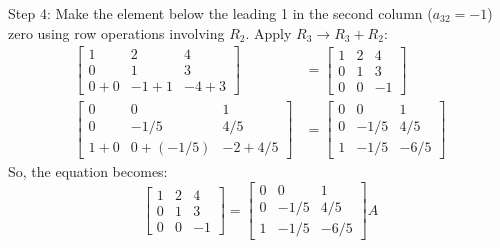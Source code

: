 \documentclass{article}
\begin{document}
Step 4: Make the element below the leading 1 in the second column ($a_{32}=-1$) zero using row operations involving $R_2$.
Apply $R_3 \to R_3 + R_2$:
\begin{align*} \begin{bmatrix} 1 & 2 & 4 \\ 0 & 1 & 3 \\ 0 + 0 & -1 + 1 & -4 + 3 \end{bmatrix} &= \begin{bmatrix} 1 & 2 & 4 \\ 0 & 1 & 3 \\ 0 & 0 & -1 \end{bmatrix} \\ \begin{bmatrix} 0 & 0 & 1 \\ 0 & -1/5 & 4/5 \\ 1 + 0 & 0 + (-1/5) & -2 + 4/5 \end{bmatrix} &= \begin{bmatrix} 0 & 0 & 1 \\ 0 & -1/5 & 4/5 \\ 1 & -1/5 & -6/5 \end{bmatrix}\end{align*}
So, the equation becomes:
\[ \begin{bmatrix} 1 & 2 & 4 \\ 0 & 1 & 3 \\ 0 & 0 & -1 \end{bmatrix} = \begin{bmatrix} 0 & 0 & 1 \\ 0 & -1/5 & 4/5 \\ 1 & -1/5 & -6/5 \end{bmatrix} A \]
\end{document}
